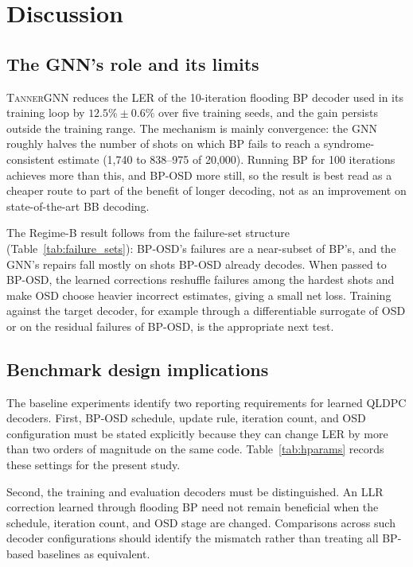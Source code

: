 \documentclass[a4paper,twocolumn,11pt,nopdfoutputerror]{quantumarticle}
\begin{document}
\section{Discussion}\label{sec:discussion}

\subsection{The GNN's role and its limits}

\textsc{TannerGNN} reduces the LER of the 10-iteration flooding BP
decoder used in its training loop by $12.5\%\pm0.6\%$ over five training
seeds, and the gain persists outside the training range. The mechanism is
mainly convergence: the GNN roughly halves the number of shots on which BP
fails to reach a syndrome-consistent estimate (1{,}740 to 838--975 of
20{,}000). Running BP for 100 iterations achieves more than this, and
BP-OSD more still, so the result is best read as a cheaper route to part
of the benefit of longer decoding, not as an improvement on
state-of-the-art BB decoding.

The Regime-B result follows from the failure-set structure
(Table~\ref{tab:failure_sets}): BP-OSD's failures are a near-subset of
BP's, and the GNN's repairs fall mostly on shots BP-OSD already decodes.
When passed to BP-OSD, the learned corrections reshuffle failures among
the hardest shots and make OSD choose heavier incorrect estimates, giving
a small net loss. Training against the target decoder, for example
through a differentiable surrogate of OSD or on the residual failures of
BP-OSD, is the appropriate next test.

\subsection{Benchmark design implications}

The baseline experiments identify two reporting requirements for learned
QLDPC decoders. First, BP-OSD schedule, update rule, iteration count, and
OSD configuration must be stated explicitly because they can change LER
by more than two orders of magnitude on the same code. Table~\ref{tab:hparams}
records these settings for the present study.

Second, the training and evaluation decoders must be distinguished. An
LLR correction learned through flooding BP need not remain beneficial
when the schedule, iteration count, and OSD stage are changed. Comparisons
across such decoder configurations should identify the mismatch rather
than treating all BP-based baselines as equivalent.
\end{document}
